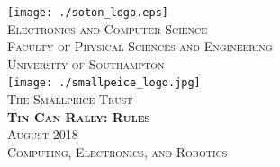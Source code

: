 \documentclass[twoside,12pt,a4paper,titlepage]{article}
\title{\gamename}
\author{\org}
\date{\timeline}
\newcommand{\gamename}{Tin Can Rally\xspace}
\newcommand{\timeline}{August 2018\xspace}
\begin{document}
\begin{titlepage}
\begin{center}
\texttt{[image: ./soton\_logo.eps]}~\\[1cm]
\textsc{\large Electronics and Computer Science}\\[0.2cm]
\textsc{\large Faculty of Physical Sciences and Engineering}\\[0.2cm]
\textsc{\large University of Southampton}\\[3.5cm]
\texttt{[image: ./smallpeice\_logo.jpg]}~\\[1cm]
\textsc{\large The Smallpeice Trust}\\[3.5cm]
\textsc{\huge \textbf{\gamename{}: Rules}}\\[1cm]
\textsc{\large \timeline}\\[3cm]
\textsc{\Large Computing, Electronics, and Robotics}
\end{center}
\end{titlepage}


\clearpage

\clearpage

\end{document}
